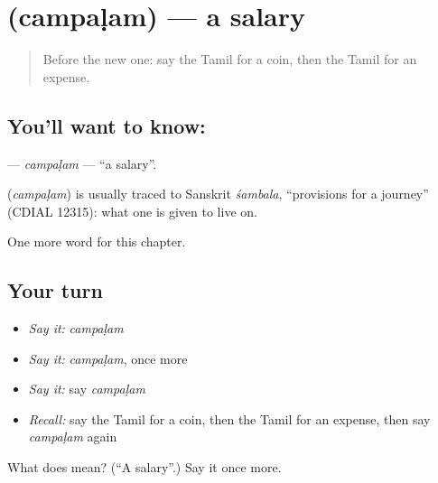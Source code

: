 \section[\texorpdfstring{\ta{சம்பளம்} (campaḷam)}{சம்பளம் (campaḷam)}]{ (campaḷam) — a salary}

\label{lesson:TA-C222-campalam}



\begin{quote}
Before the new one: say the Tamil for a coin, then the Tamil for an expense.
\end{quote}

\subsection*{You'll want to know: }
\textbf{} — \emph{campaḷam} — \textquotedblleft{}a salary\textquotedblright{}.

\begin{cousinweb}
\textbf{} (\emph{campaḷam}) is usually traced to Sanskrit \emph{śambala}, \textquotedblleft{}provisions for a journey\textquotedblright{} (CDIAL 12315): what one is given to live on.
\end{cousinweb}

\begin{grammarlens}[title={What you've built}]
One more word for this chapter.
\end{grammarlens}

\subsection*{Your turn}
\begin{itemize}
\raggedright
  \item \emph{Say it:} \emph{campaḷam}
  \item \emph{Say it:} \emph{campaḷam}, once more
  \item \emph{Say it:} say \emph{campaḷam}
  \item \emph{Recall:} say the Tamil for a coin, then the Tamil for an expense, then say \emph{campaḷam} again
\end{itemize}

\begin{tcolorbox}[breakable,colback=teal!4,colframe=teal!35!black,title={Before you move on}]
What does  mean? (\textquotedblleft{}A salary\textquotedblright{}.) Say it once more.
\end{tcolorbox}
